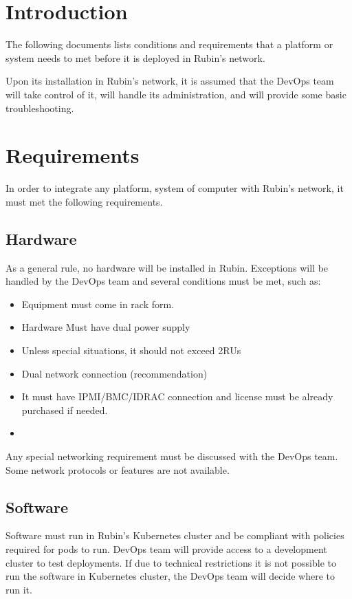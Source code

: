 \section{Introduction}

The following documents lists conditions and requirements that a platform or system needs to met before it is deployed in Rubin's network. 

Upon its installation in Rubin's network, it is assumed that the DevOps team will take control of it, will handle its administration, and will provide some basic troubleshooting. 

\section{Requirements}

In order to integrate any platform, system of computer with Rubin's network, it must met the following requirements. 

\subsection{Hardware}

As a general rule, no hardware will be installed in Rubin. Exceptions will be handled by the DevOps team and several conditions must be met, such as:

\begin{itemize}
    \item Equipment must come in rack form. 
    \item Hardware Must have dual power supply
    \item Unless special situations, it should not exceed 2RUs
    \item Dual network connection (recommendation) 
    \item It must have IPMI/BMC/IDRAC connection and license must be already purchased if needed.
    \item 
\end{itemize}

Any special networking requirement must be discussed with the DevOps team. Some network protocols or features are not available.

\subsection{Software}

Software must run in Rubin’s  Kubernetes cluster and be compliant with policies required for pods to run. DevOps team will provide access to a development cluster to test deployments. If due to technical restrictions it is not possible to run the software in Kubernetes cluster, the DevOps team will decide where to run it. 

